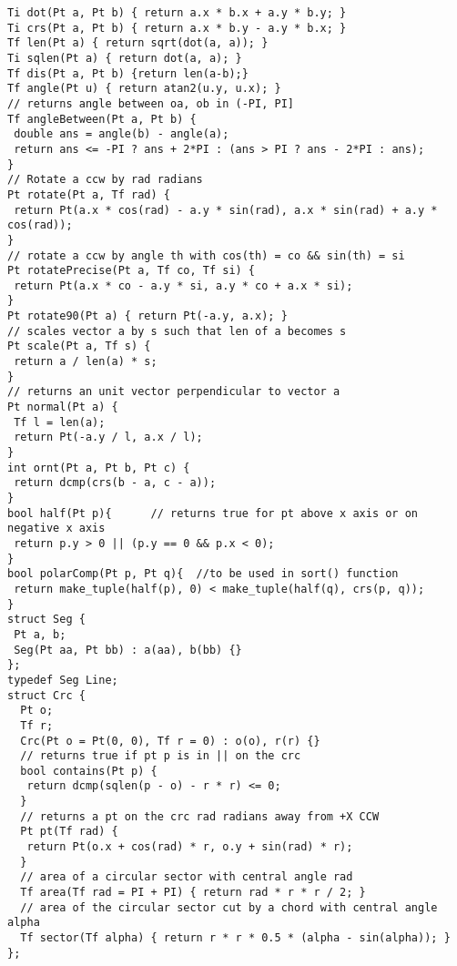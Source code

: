 \documentclass[a4paper,11pt,oneside]{article}
\begin{document}
\begin{multicols*}{\COLS}
\begin{lstlisting}
Ti dot(Pt a, Pt b) { return a.x * b.x + a.y * b.y; }
Ti crs(Pt a, Pt b) { return a.x * b.y - a.y * b.x; }
Tf len(Pt a) { return sqrt(dot(a, a)); }
Ti sqlen(Pt a) { return dot(a, a); }
Tf dis(Pt a, Pt b) {return len(a-b);}
Tf angle(Pt u) { return atan2(u.y, u.x); }
// returns angle between oa, ob in (-PI, PI]
Tf angleBetween(Pt a, Pt b) {
 double ans = angle(b) - angle(a);
 return ans <= -PI ? ans + 2*PI : (ans > PI ? ans - 2*PI : ans);
}
// Rotate a ccw by rad radians
Pt rotate(Pt a, Tf rad) {
 return Pt(a.x * cos(rad) - a.y * sin(rad), a.x * sin(rad) + a.y * cos(rad));
}
// rotate a ccw by angle th with cos(th) = co && sin(th) = si
Pt rotatePrecise(Pt a, Tf co, Tf si) {
 return Pt(a.x * co - a.y * si, a.y * co + a.x * si);
}
Pt rotate90(Pt a) { return Pt(-a.y, a.x); }
// scales vector a by s such that len of a becomes s
Pt scale(Pt a, Tf s) {
 return a / len(a) * s;
}
// returns an unit vector perpendicular to vector a
Pt normal(Pt a) {
 Tf l = len(a);
 return Pt(-a.y / l, a.x / l);
}
int ornt(Pt a, Pt b, Pt c) {
 return dcmp(crs(b - a, c - a));
}
bool half(Pt p){      // returns true for pt above x axis or on negative x axis
 return p.y > 0 || (p.y == 0 && p.x < 0);
}
bool polarComp(Pt p, Pt q){  //to be used in sort() function
 return make_tuple(half(p), 0) < make_tuple(half(q), crs(p, q));
}
struct Seg {
 Pt a, b;
 Seg(Pt aa, Pt bb) : a(aa), b(bb) {}
};
typedef Seg Line;
struct Crc {
  Pt o;
  Tf r;
  Crc(Pt o = Pt(0, 0), Tf r = 0) : o(o), r(r) {}
  // returns true if pt p is in || on the crc
  bool contains(Pt p) {
   return dcmp(sqlen(p - o) - r * r) <= 0;
  }
  // returns a pt on the crc rad radians away from +X CCW
  Pt pt(Tf rad) {
   return Pt(o.x + cos(rad) * r, o.y + sin(rad) * r);
  }
  // area of a circular sector with central angle rad
  Tf area(Tf rad = PI + PI) { return rad * r * r / 2; }
  // area of the circular sector cut by a chord with central angle alpha
  Tf sector(Tf alpha) { return r * r * 0.5 * (alpha - sin(alpha)); }
};
\end{lstlisting}

\end{multicols*}
\end{document}
